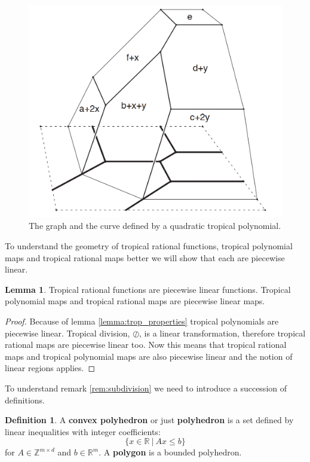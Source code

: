 \documentclass{article}
\theoremstyle{definition}
\newtheorem{lemma}[theorem]{Lemma}
\newtheorem{definition}[theorem]{Definition}
\newcommand*{\figuretitle}[1]{%
    {\centering%
    \textbf{#1}%
    \par\medskip}%
}
\begin{document}
\begin{figure}[H]
\centering
\includegraphics[scale=0.5]{graphics/quad_trop_pol_proj.PNG}
\caption{The graph and the curve defined by a quadratic tropical polynomial.\cite[p.~22]{maclagan2015introduction}}
\label{fig:quad_trop_var}
\end{figure}

To understand the geometry of tropical rational functions, tropical polynomial maps and tropical rational maps better we will show that each are piecewise linear.


\begin{lemma}
Tropical rational functions are piecewise linear functions. Tropical polynomial maps and tropical rational maps are piecewise linear maps.
\end{lemma}
\begin{proof}
Because of lemma \ref{lemma:trop_properties} tropical polynomials are piecewise linear. Tropical division, $\oslash$, is a linear transformation, therefore tropical rational maps are piecewise linear too. Now this means that tropical rational maps and tropical polynomial maps are also piecewise linear and the notion of linear regions applies.
\end{proof}

To understand remark \ref{rem:subdivision} we need to introduce a succession of definitions.

\begin{definition}\hspace{1sp}\cite[p.~4]{zhang2018tropical}
A \textbf{convex polyhedron} or just \textbf{polyhedron} is a set defined by linear inequalities with integer coefficients:
$$\{x \in \mathbb{R} \ | \ Ax \leq b \}$$
for $A \in \mathbb{Z}^{m \times d}$ and $b \in \mathbb{R}^{m}$. A \textbf{polygon} is a bounded polyhedron.
\end{definition}
\end{document}
